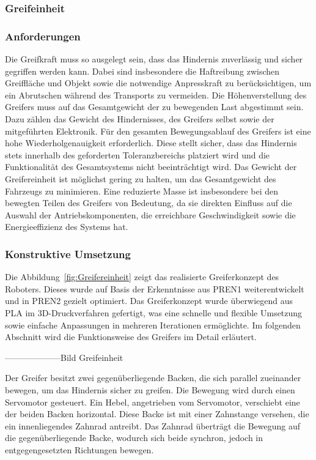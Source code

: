 \documentclass[main.tex]{subfiles} %
\begin{document}

\subsubsection{Greifeinheit}

\subsubsection*{Anforderungen}

Die Greifkraft muss so ausgelegt sein, dass das Hindernis zuverlässig und sicher gegriffen werden kann. 
Dabei sind insbesondere die Haftreibung zwischen Greiffläche und Objekt sowie die notwendige Anpresskraft 
zu berücksichtigen, um ein Abrutschen während des Transports zu vermeiden.
Die Höhenverstellung des Greifers muss auf das Gesamtgewicht der zu bewegenden Last abgestimmt sein. 
Dazu zählen das Gewicht des Hindernisses, des Greifers selbst sowie der mitgeführten Elektronik. 
Für den gesamten Bewegungsablauf des Greifers ist eine hohe Wiederholgenauigkeit erforderlich. 
Diese stellt sicher, dass das Hindernis stets innerhalb des geforderten Toleranzbereichs platziert 
wird und die Funktionalität des Gesamtsystems nicht beeinträchtigt wird.
Das Gewicht der Greifereinheit ist möglichst gering zu halten, um das Gesamtgewicht des Fahrzeugs zu minimieren. 
Eine reduzierte Masse ist insbesondere bei den bewegten Teilen des Greifers von Bedeutung, 
da sie direkten Einfluss auf die Auswahl der Antriebskomponenten, die erreichbare Geschwindigkeit 
sowie die Energieeffizienz des Systems hat.

\subsubsection*{Konstruktive Umsetzung}

Die Abbildung~\ref{fig:Greifereinheit} zeigt das realisierte Greiferkonzept des Roboters.
Dieses wurde auf Basis der Erkenntnisse aus PREN1 weiterentwickelt und in PREN2 gezielt optimiert.
Das Greiferkonzept wurde überwiegend aus PLA im 3D-Druckverfahren gefertigt, 
was eine schnelle und flexible Umsetzung sowie einfache Anpassungen in mehreren Iterationen ermöglichte.
Im folgenden Abschnitt wird die Funktionsweise des Greifers im Detail erläutert.

--------------------Bild Greifeinheit

\newpage

Der Greifer besitzt zwei gegenüberliegende Backen, die sich parallel zueinander bewegen, 
um das Hindernis sicher zu greifen. Die Bewegung wird durch einen Servomotor gesteuert. 
Ein Hebel, angetrieben vom Servomotor, verschiebt eine der beiden Backen horizontal. 
Diese Backe ist mit einer Zahnstange versehen, die ein innenliegendes Zahnrad antreibt. 
Das Zahnrad überträgt die Bewegung auf die gegenüberliegende Backe, wodurch sich beide 
synchron, jedoch in entgegengesetzten Richtungen bewegen. 
\end{document}

